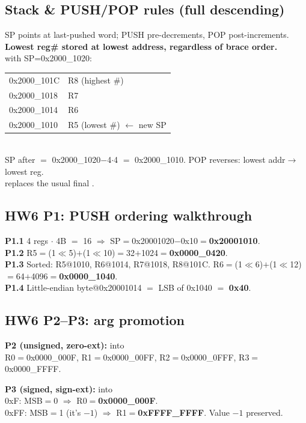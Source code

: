 \subsection{Stack \& PUSH/POP rules (full descending)}
SP points at last-pushed word; PUSH pre-decrements, POP post-increments. \textbf{Lowest reg\# stored at lowest address, regardless of brace order.}\\
 with SP=0x2000\_1020:\\
\begin{tabular}{@{}ll@{}}
0x2000\_101C & R8 (highest \#) \\
0x2000\_1018 & R7 \\
0x2000\_1014 & R6 \\
0x2000\_1010 & R5 (lowest \#) $\leftarrow$ new SP \\
\end{tabular}\\
SP after $=$ 0x2000\_1020$-$4$\cdot$4 $=$ 0x2000\_1010. POP reverses: lowest addr$\to$lowest reg.\\
 replaces the usual final .

\subsection{HW6 P1: PUSH ordering walkthrough}
\begin{hwp}\textbf{P1.1} 4 regs $\cdot$ 4B $=$ 16 $\Rightarrow$ SP$=$0x20001020$-$0x10$=$\textbf{0x20001010}.\\
\textbf{P1.2} R5$=$(1$\ll$5)$+$(1$\ll$10)$=$32$+$1024$=$\textbf{0x0000\_0420}.\\
\textbf{P1.3} Sorted: R5@1010, R6@1014, R7@1018, R8@101C. R6$=$(1$\ll$6)$+$(1$\ll$12)$=$64$+$4096$=$\textbf{0x0000\_1040}.\\
\textbf{P1.4} Little-endian byte@0x20001014 $=$ LSB of 0x1040 $=$ \textbf{0x40}.
\end{hwp}

\subsection{HW6 P2--P3: arg promotion}
\begin{hwp}\textbf{P2 (unsigned, zero-ext):}
into \\
R0$=$0x0000\_000F, R1$=$0x0000\_00FF, R2$=$0x0000\_0FFF, R3$=$0x0000\_FFFF.\end{hwp}
\begin{hwp}\textbf{P3 (signed, sign-ext):}  into \\
0xF: MSB$=$0 $\Rightarrow$ R0$=$\textbf{0x0000\_000F}.\\
0xFF: MSB$=$1 (it's $-1$) $\Rightarrow$ R1$=$\textbf{0xFFFF\_FFFF}. Value $-1$ preserved.\end{hwp}

